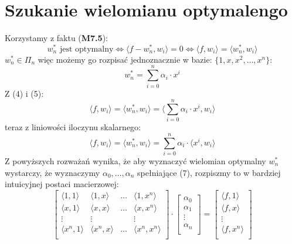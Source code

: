 \documentclass{article}
\begin{document}
\section{Szukanie wielomianu optymalengo}
Korzystamy z faktu (\textbf{M7.5}):
\begin{equation}
w^*_n \text{ jest optymalny} \iff \langle f-w_n^*,w_i\rangle = 0 \iff \langle f,w_i\rangle = \langle w_n^*,w_i\rangle
\end{equation}
$w^*_n \in \Pi_n$ więc możemy go rozpisać jednoznacznie w bazie: $\{1,x,x^2,\ldots,x^n\}$:
\begin{equation}
w^*_n = \sum_{i=0}^n \alpha_i \cdot x^i
\end{equation}
Z (4) i (5):
\begin{equation}
\langle f,w_i\rangle = \langle w_n^*,w_i\rangle = \langle\sum_{i=0}^n \alpha_i \cdot x^i,w_i\rangle
\end{equation}
teraz z liniowości iloczynu skalarnego:
\begin{equation}
\langle f,w_i\rangle = \langle w_n^*,w_i\rangle = \sum_{i=0}^n \alpha_i \cdot \langle x^i,w_i\rangle
\end{equation}
Z powyższych rozważań wynika, że aby wyznaczyć wielomian optymalny $w^*_n$ wystarczy, że wyznaczymy $\alpha_0, \ldots, \alpha_n$ spełniające (7), rozpiszmy to w bardziej intuicyjnej postaci macierzowej:
\begin{equation}
\begin{bmatrix}
\langle 1,1 \rangle & \langle 1,x \rangle & \ldots & \langle 1,x^n \rangle\\
\langle x,1 \rangle & \langle x,x \rangle & \ldots & \langle x,x^n \rangle\\
\vdots & \vdots & & \vdots\\
\langle x^n,1 \rangle & \langle x^n,x \rangle & \ldots & \langle x^n,x^n \rangle\\
\end{bmatrix} \cdot
\begin{bmatrix}
\alpha_0 \\
\alpha_1 \\
\vdots\\
\alpha_n \\
\end{bmatrix} =
\begin{bmatrix}
\langle f,1 \rangle \\
\langle f,x \rangle \\
\vdots \\
\langle f,x^n \rangle \\
\end{bmatrix}
\end{equation}
\end{document}
